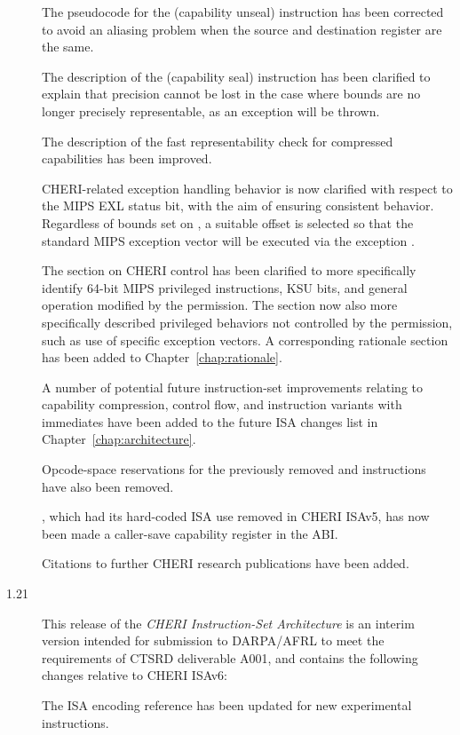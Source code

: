 \begin{description}
  The pseudocode for the  (capability unseal) instruction
  has been corrected to avoid an aliasing problem when the source and
  destination register are the same.

  The description of the  (capability seal) instruction has
  been clarified to explain that precision cannot be lost in the case where
  bounds are no longer precisely representable, as an exception will be thrown.

  The description of the fast representability check for compressed capabilities
  has been improved.

  CHERI-related exception handling behavior is now clarified with respect to the
  MIPS EXL status bit, with the aim of ensuring consistent behavior.
  Regardless of bounds set on \KCC{}, a suitable offset is selected so that the
  standard MIPS exception vector will be executed via the exception \PCC{}.

  The section on CHERI control has been
  clarified to more specifically identify 64-bit MIPS privileged instructions,
  KSU bits, and general operation modified by the \cappermASR
  permission.
  The section now also more specifically described privileged behaviors not
  controlled by the permission, such as use of specific exception vectors.
  A corresponding rationale section has been added to
  Chapter~\ref{chap:rationale}.

  A number of potential future instruction-set improvements relating to
  capability compression, control flow, and instruction variants with immediates
  have been added to the future ISA changes list in
  Chapter~\ref{chap:architecture}.

  Opcode-space reservations for the previously removed 
  and  instructions have also been removed.

  , which had its hard-coded ISA use removed in CHERI ISAv5, has now
  been made a caller-save capability register in the ABI.

  Citations to further CHERI research publications have been added.

\item[1.21] This release of the \textit{CHERI Instruction-Set Architecture} is
  an interim version intended for submission to DARPA/AFRL to meet the
  requirements of CTSRD deliverable A001, and contains the following changes
  relative to CHERI ISAv6:

  The ISA encoding reference has been updated for new experimental
  instructions.


\end{description}
